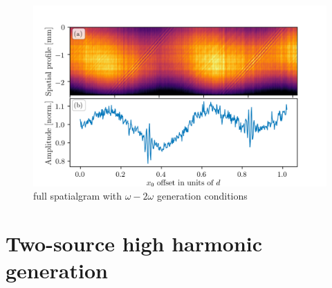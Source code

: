 \begin{figure}
	\centering
	\includegraphics[width=1.0\textwidth]{figures/Two_source/full_spatialgram_w2w.png}
	\caption{full spatialgram with $\omega-2\omega$ generation conditions}
	\label{fig:full_spatialgram_w2w}
\end{figure}


\section{Two-source high harmonic generation}



